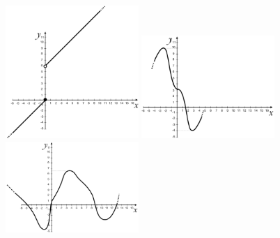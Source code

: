 \begin{itemize}
\begin{figure}[htpb!]
\quad\includegraphics[width=0.45\textwidth]{img/funz_17b.png}   
  
\quad\includegraphics[width=0.45\textwidth]{img/funz_17c.png}   
  
\quad\includegraphics[width=0.45\textwidth]{img/funz_17d.png}
  \end{figure}
  \end{itemize}

